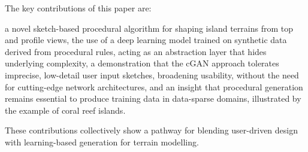 The key contributions of this paper are:
\begin{Itemize}
    \Item{} a novel sketch-based procedural algorithm for shaping island terrains from top and profile views,
    \Item{} the use of a deep learning model trained on synthetic data derived from procedural rules, acting as an abstraction layer that hides underlying complexity,
    \Item{} a demonstration that the cGAN approach tolerates imprecise, low-detail user input sketches, broadening usability, without the need for cutting-edge network architectures,
    \Item{} and an insight that procedural generation remains essential to produce training data in data-sparse domains, illustrated by the example of coral reef islands.
\end{Itemize}
These contributions collectively show a pathway for blending user-driven design with learning-based generation for terrain modelling.
